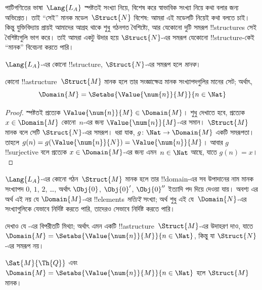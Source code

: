 \documentclass[../../../include/open-logic-section]{subfiles}
\begin{document}

পাটিগণিতের ভাষা~$\Lang{L_A}$ স্পষ্টতই সংখ্যা নিয়ে, বিশেষ করে
স্বাভাবিক সংখ্যা নিয়ে কথা বলার জন্য অভিপ্রেত। তাই ``সেই'' মানক
মডেল~$\Struct{N}$ বিশেষ: আমরা এই মডেলটি নিয়েই কথা বলতে চাই। কিন্তু
যুক্তিবিদ্যায় প্রায়ই আমাদের আগ্রহ থাকে শুধু গঠনগত বৈশিষ্ট্যে, আর যেকোনো
দুটি সমরূপ !!{structure}s সেই বৈশিষ্ট্যগুলি ভাগ করে। তাই আমরা একটু
উদার হয়ে $\Struct{N}$-এর সমরূপ যেকোনো !!{structure}-কেই ``মানক''
বিবেচনা করতে পারি।

\begin{defn}
$\Lang{L_A}$-এর কোনো !!{structure}, $\Struct{N}$-এর সমরূপ হলে
\emph{মানক}।
\end{defn}

\begin{prop}
 কোনো !!a{structure}~$\Struct{M}$ মানক
হলে তার সংজ্ঞাক্ষেত্র মানক সংখ্যাপদগুলির মানের সেট; অর্থাৎ,
\[
\Domain{M} = \Setabs{\Value{\num{n}}{M}}{n \in \Nat}
\]
\end{prop}

\begin{proof}
স্পষ্টতই প্রত্যেক $\Value{\num{n}}{M} \in \Domain{M}$। শুধু দেখাতে হবে,
প্রত্যেক $x \in \Domain{M}$ কোনো~$n$-এর জন্য
$\Value{\num{n}}{M}$-এর সমান। $\Struct{M}$ মানক বলে সেটি
$\Struct{N}$-এর সমরূপ। ধরা যাক, $g\colon \Nat \to \Domain{M}$ একটি
সমরূপতা। তাহলে $g(n) = g(\Value{\num{n}}{N}) =
\Value{\num{n}}{M}$। আবার $g$ !!{surjective} বলে প্রত্যেক
$x \in \Domain{M}$-এর জন্য এমন~$n \in \Nat$ আছে, যাতে $g(n)=x$।
\end{proof}

\begin{explain}
$\Lang{L_A}$-এর কোনো গঠন~$\Struct{M}$ মানক হলে তার !!{domain}-এর সব
উপাদানের নাম মানক সংখ্যাপদ $\num{0}$, $\num{1}$, $\num{2}$, \dots,
অর্থাৎ $\Obj{0}$, $\Obj{0}'$, $\Obj{0}''$ ইত্যাদি পদ দিয়ে দেওয়া যায়।
অবশ্য এর অর্থ এই নয় যে $\Domain{M}$-এর !!{element}s
\emph{সত্যিই} সংখ্যা; অর্থ শুধু এই যে~$\Domain{N}$-এর সংখ্যাগুলিকে
যেভাবে নির্দিষ্ট করতে পারি, তাদেরও সেভাবে নির্দিষ্ট করতে পারি।
\end{explain}

\begin{prob}
দেখাও যে -এর বিপরীতটি মিথ্যা;
অর্থাৎ এমন একটি !!a{structure}~$\Struct{M}$-এর উদাহরণ দাও, যাতে
$\Domain{M} = \Setabs{\Value{\num{n}}{M}}{n \in \Nat}$, কিন্তু যা
$\Struct{N}$-এর সমরূপ নয়।
\end{prob}

\begin{prop}
$\Sat{M}{\Th{Q}}$ এবং $\Domain{M} =
\Setabs{\Value{\num{n}}{M}}{n \in \Nat}$ হলে $\Struct{M}$ মানক।
\end{prop}
\end{document}
